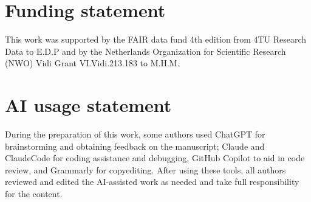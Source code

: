 \documentclass[11pt,a4paper]{article}
\begin{document}
\section*{Funding statement}

This work was supported by the FAIR data fund 4th edition from 4TU Research Data to E.D.P and by the
Netherlands Organization for Scientific Research (NWO) Vidi Grant VI.Vidi.213.183 to M.H.M.

\section*{AI usage statement}

During the preparation of this work, some authors used ChatGPT for brainstorming and obtaining
feedback on the manuscript; Claude and ClaudeCode for coding assistance and debugging, GitHub
Copilot to aid in code review, and Grammarly for copyediting. After using these tools, all authors reviewed and edited the AI-assisted work as needed and take full responsibility for the content.

\clearpage
\end{document}
